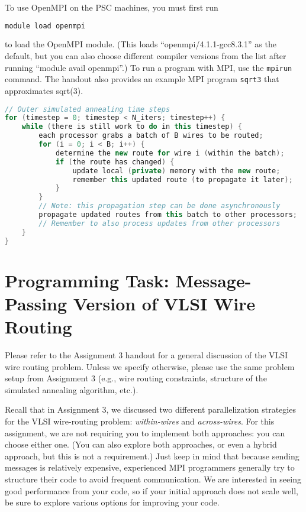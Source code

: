 \documentclass[11pt]{article}
\begin{document}
To use OpenMPI on the PSC machines, you must first run

\begin{lstlisting}[language=bash]
module load openmpi
\end{lstlisting}

to load the OpenMPI module. (This loads ``openmpi/4.1.1-gcc8.3.1'' as the default, but you can also choose different compiler versions from the list after running ``module avail openmpi''.) To run a program with MPI, use the \texttt{mpirun} command. The handout also provides an example MPI program \texttt{sqrt3} that approximates sqrt(3).

\begin{minipage}{\linewidth}
\begin{lstlisting}[language=C++,label=lst:batching,caption={Pseudo-code for the outer control structure of a message-passing version of the Across-Wires approach with batching (where $B$ is the batch size).}] 
// Outer simulated annealing time steps
for (timestep = 0; timestep < N_iters; timestep++) {
    while (there is still work to do in this timestep) {
        each processor grabs a batch of B wires to be routed;
        for (i = 0; i < B; i++) {
            determine the new route for wire i (within the batch);
            if (the route has changed) {
                update local (private) memory with the new route;
                remember this updated route (to propagate it later);
            }
        }
        // Note: this propagation step can be done asynchronously
        propagate updated routes from this batch to other processors;
        // Remember to also process updates from other processors
    }
}
\end{lstlisting}
\end{minipage}

\section*{Programming Task: Message-Passing Version of VLSI Wire Routing}

Please refer to the Assignment 3 handout for a general discussion of the VLSI wire routing problem. Unless we specify otherwise, please use the same problem setup from Assignment 3 (e.g., wire routing constraints, structure of the simulated annealing algorithm, etc.).

Recall that in Assignment 3, we discussed two different parallelization strategies for the VLSI wire-routing problem: \textit{within-wires} and \textit{across-wires}. For this assignment, we are not requiring you to implement both approaches: you can choose either one. (You can also explore both approaches, or even a hybrid approach, but this is not a requirement.) Just keep in mind that because sending messages is relatively expensive, experienced MPI programmers generally try to structure their code to avoid frequent communication. We are interested in seeing good performance from your code, so if your initial approach does not scale well, be sure to explore various options for improving your code.
\end{document}
